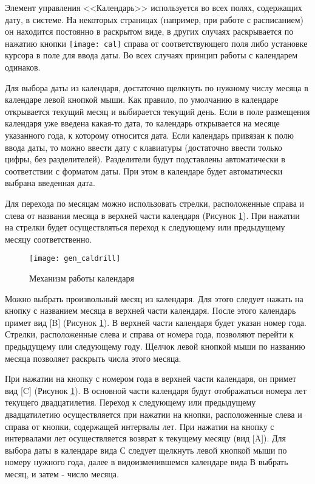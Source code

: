 Элемент управления <<Календарь>> используется во всех полях, содержащих дату, в системе. На некоторых страницах (например, при работе с расписанием) он находится постоянно в раскрытом виде, в других случаях раскрывается по нажатию кнопки \texttt{[image: cal]} справа от соответствующего поля либо установке курсора в поле для ввода даты. Во всех случаях принцип работы с календарем одинаков.

Для выбора даты из календаря, достаточно щелкнуть по нужному числу месяца в календаре левой кнопкой мыши.  Как правило, по умолчанию в календаре открывается текущий месяц и выбирается текущий день. Если в поле размещения календаря уже введена какая-то дата, то календарь открывается на месяце указанного года, к которому относится дата. Если календарь привязан к полю ввода даты, то можно ввести дату с клавиатуры (достаточно ввести только цифры, без разделителей). Разделители будут подставлены автоматически в соответствии с форматом даты. При этом в календаре будет автоматически выбрана введенная дата.

Для перехода по месяцам можно использовать стрелки, расположенные справа и слева от названия месяца в верхней части календаря (Рисунок \ref{img_gen_caldrill}). При нажатии на стрелки будет осуществляться переход к следующему или предыдущему месяцу соответственно.

\begin{figure}[!ht]\centering
	\texttt{[image: gen\_caldrill]}
	\caption{Механизм работы календаря}
	\label{img_gen_caldrill}
\end{figure} 

Можно выбрать произвольный месяц из календаря. Для этого следует нажать на кнопку с названием месяца в верхней части календаря. После этого календарь примет вид [B] (Рисунок \ref{img_gen_caldrill}). В верхней части календаря будет указан номер года. Стрелки, расположенные слева и справа от номера года, позволяют перейти к предыдущему или следующему году. Щелчок левой кнопкой мыши по названию месяца позволяет раскрыть числа этого месяца.

При нажатии на кнопку с номером года в верхней части календаря, он примет вид [C] (Рисунок \ref{img_gen_caldrill}). В основной части календаря будут отображаться номера лет текущего двадцатилетия. Переход к следующему или предыдущему двадцатилетию осуществляется при нажатии на кнопки, расположенные слева и справа от кнопки, содержащей интервалы лет. При нажатии на кнопку с интервалами лет осуществляется возврат к текущему месяцу (вид [A]). Для выбора даты в календаре вида С следует щелкнуть левой кнопкой мыши по номеру нужного года, далее в видоизменившемся календаре вида В выбрать месяц, и затем - число месяца.
 
